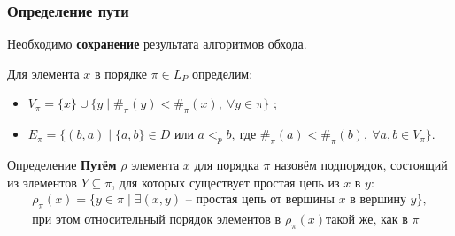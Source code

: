 \begin{frame}
  \frametitle{Определение пути}
  \begin{block}{}
    Необходимо \textbf{сохранение} результата алгоритмов обхода.
  \end{block}

  Для элемента $x$ в порядке $\pi \in L_P$ определим:
  \begin{itemize}
    \item $V_\pi = \{x\} \cup \{y \mid \#_{\pi}(y) <
      \#_{\pi}(x),\ \forall y \in \pi\}$ ;
    \item $E_\pi = \{(b, a) \mid \{a, b\} \in D \text{ или } a <_p
        b,\ \text{где } \#_{\pi}(a) < \#_{\pi}(b),\ \forall a,b \in
      V_\pi\}$.
  \end{itemize}

  \begin{block}{Определение}
    \textbf{Путём} $\rho$ элемента $x$ для порядка $\pi$ назовём
    подпорядок, состоящий из элементов $Y \subseteq \pi$, для которых
    существует простая цепь из $x$ в $y$:
    \begin{equation}
      \begin{aligned}
        \rho_{\pi}(x) = \{y \in \pi \mid \exists (x, y) \text{ --
            простая цепь от
        вершины } x \text{ в вершину } y\}, \\
        \text{при этом относительный порядок элементов в } \rho_{\pi}(x) \text{
        такой же, как в } \pi
        \nonumber
      \end{aligned}
      \label{eq:def_suborder}
    \end{equation}
  \end{block}

\end{frame}

